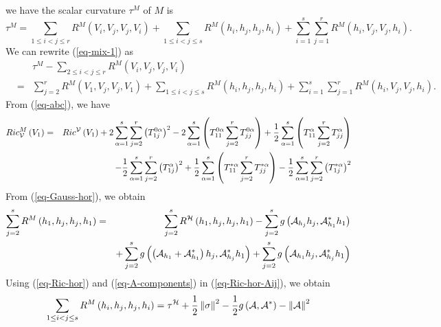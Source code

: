 \documentclass[10pt,a4paper]{article}
\theoremstyle{definition}
\theoremstyle{remark}
\numberwithin{equation}{section}
\begin{document}
we have
the scalar curvature $\tau ^{M}$ of $M$ is%
\begin{equation}
\tau ^{M}=\sum_{1\leq i<j\leq r}R^{M}\left( V_{i},V_{j},V_{j},V_{i}\right)
+\sum_{1\leq i<j\leq s}R^{M}\left( h_{i},h_{j},h_{j},h_{i}\right)
+\sum_{i=1}^{s}\sum_{j=1}^{r}R^{M}\left( h_{i},V_{j},V_{j},h_{i}\right) .
\label{eq-mix-1}
\end{equation}%
We can rewrite (\ref{eq-mix-1}) as%
\begin{eqnarray}
&&\tau ^{M}-\sum_{2\leq i<j\leq r}R^{M}\left( V_{i},V_{j},V_{j},V_{i}\right)
\nonumber \\
&=&\sum_{j=2}^{r}R^{M}\left( V_{1},V_{j},V_{j},V_{1}\right) +\sum_{1\leq
i<j\leq s}R^{M}\left( h_{i},h_{j},h_{j},h_{i}\right)
+\sum_{i=1}^{s}\sum_{j=1}^{r}R^{M}\left( h_{i},V_{j},V_{j},h_{i}\right) .
\label{eq-mix-2}
\end{eqnarray}%
From (\ref{eq-abc}), we have%
\begin{eqnarray}
Ric_{{\cal V}}^{M}\left( V_{1}\right) &=&Ric^{{\cal V}}\left( V_{1}\right)
+2\sum_{\alpha =1}^{s}\sum_{j=2}^{r}\left( T_{1j}^{0\alpha }\right)
^{2}-2\sum_{\alpha =1}^{s}\left( T_{11}^{0\alpha
}\sum_{j=2}^{r}T_{jj}^{0\alpha }\right) +\frac{1}{2}\sum_{\alpha
=1}^{s}\left( T_{11}^{\alpha }\sum_{j=2}^{r}T_{jj}^{\alpha }\right) 
\nonumber \\
&&-\frac{1}{2}\sum_{\alpha =1}^{s}\sum_{j=2}^{r}\left( T_{1j}^{\alpha
}\right) ^{2}+\frac{1}{2}\sum_{\alpha =1}^{s}\left( T_{11}^{\ast \alpha
}\sum_{j=2}^{r}T_{jj}^{\ast \alpha }\right) -\frac{1}{2}\sum_{\alpha
=1}^{s}\sum_{j=2}^{r}\left( T_{1j}^{\ast \alpha }\right) ^{2}  \label{Ric-v}
\end{eqnarray}%
From (\ref{eq-Gauss-hor}), we obtain%
\begin{eqnarray}
\sum_{j=2}^{s}R^{M}\left( h_{1},h_{j},h_{j},h_{1}\right) &=&\sum_{j=2}^{s}R^{%
{\cal H}}\left( h_{1},h_{j},h_{j},h_{1}\right) -\sum_{j=2}^{s}g\left( {\cal A%
}_{h_{j}}h_{j},{\cal A}_{h_{1}}^{\ast }h_{1}\right)  \nonumber \\
&&+\sum_{j=2}^{s}g\left( \left( {\cal A}_{h_{1}}+{\cal A}_{h_{1}}^{\ast
}\right) h_{j},{\cal A}_{h_{j}}^{\ast }h_{1}\right) +\sum_{j=2}^{s}g\left( 
{\cal A}_{h_{1}}h_{j},{\cal A}_{h_{j}}^{\ast }h_{1}\right)
\label{eq-Ric-hor-Aij}
\end{eqnarray}%
Using (\ref{eq-Ric-hor}) and (\ref{eq-A-components}) in (\ref{eq-Ric-hor-Aij}), we
obtain%
\begin{equation}
\sum_{1\leq i<j\leq s}R^{M}\left( h_{i},h_{j},h_{j},h_{i}\right) =\tau ^{%
{\cal H}}+\frac{1}{2}\left\Vert \sigma \right\Vert ^{2}-\frac{1}{2}g\left( 
{\cal A},{\cal A}^{\ast }\right) -\left\Vert {\cal A}\right\Vert ^{2}
\label{Ric-H}
\end{equation}%
\end{document}
